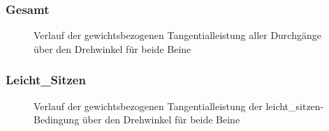 \documentclass[
  letterpaper,
  DIV=11]{scrartcl}
\begin{document}
\subsubsection{Gesamt}

\begin{figure}


\caption{\label{fig-Tangentialleistung_Alle}Verlauf der
gewichtsbezogenen Tangentialleistung aller Durchgänge über den
Drehwinkel für beide Beine}

\end{figure}%

\subsubsection{Leicht\_Sitzen}

\begin{figure}


\caption{\label{fig-Tangentialleistung_Leicht_Sitzen}Verlauf der
gewichtsbezogenen Tangentialleistung der leicht\_sitzen-Bedingung über
den Drehwinkel für beide Beine}

\end{figure}%
\end{document}
